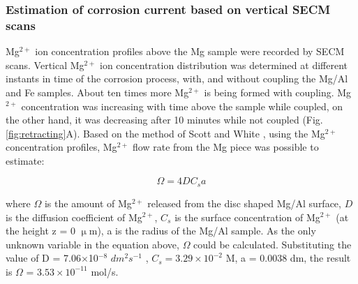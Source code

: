 			\subsubsection{Estimation of corrosion current based on vertical SECM scans}
Mg$^{2+}$ ion concentration profiles above the Mg sample were recorded by SECM scans.
Vertical Mg$^{2+}$ ion concentration distribution was determined at different instants in time of the corrosion process, with, and without coupling the Mg/Al and Fe samples.
About ten times more Mg$^{2+}$ is being formed with coupling.
Mg$^{2+}$ concentration was increasing with time above the sample while coupled, on the other hand, it was decreasing after 10 minutes while not coupled (Fig. \ref{fig:retracting}A).
Based on the method of Scott and White \cite{scott1993iontophoretic}, using the Mg$^{2+}$ concentration profiles, Mg$^{2+}$ flow rate from the Mg piece was possible to estimate:

\begin{equation}
\label{eq:corrosion_current}
        \Omega = 4 D C_s a
\end{equation}

where $\Omega$ is the amount of Mg$^{2+}$ released from the disc shaped Mg/Al surface, $D$ is the diffusion coefficient of Mg$^{2+}$, $C_s$ is the surface concentration of Mg$^{2+}$ (at the height z = 0 $\upmu$m), a is the radius of the Mg/Al sample.
As the only unknown variable in the equation above, $\Omega$ could be calculated.
Substituting the value of D = 7.06$\times$10$^{-8}$ $dm^2s^{-1}$ \cite{lide2001crc}, $C_s=3.29\times10^{-2}$ M, a = 0.0038 dm, the result is $\Omega$ = $3.53\times10^{-11}$ mol/s.

